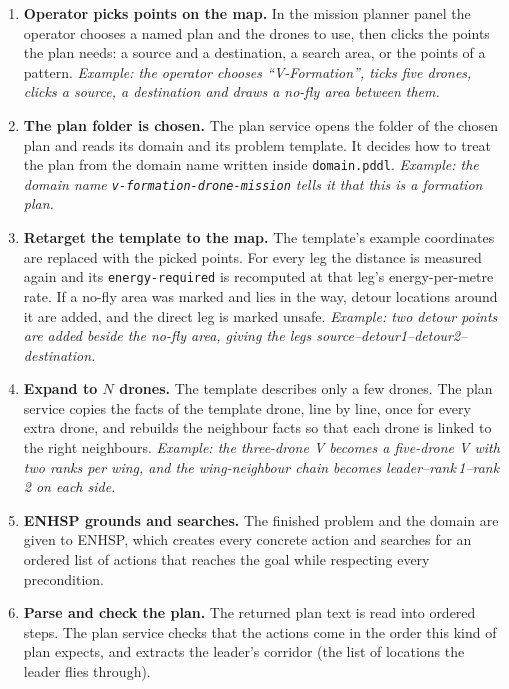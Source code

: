 \documentclass[11pt,a4paper,oneside]{report}
\newcommand{\code}[1]{\texttt{#1}}
\begin{document}
\begin{enumerate}[label=\textbf{Step \arabic*.},leftmargin=*,itemsep=4pt]
  \item \textbf{Operator picks points on the map.} In the mission planner panel the operator
        chooses a named plan and the drones to use, then clicks the points the plan needs: a
        source and a destination, a search area, or the points of a pattern. \emph{Example: the
        operator chooses ``V-Formation'', ticks five drones, clicks a source, a destination and
        draws a no-fly area between them.}
  \item \textbf{The plan folder is chosen.} The plan service opens the folder of the chosen plan
        and reads its domain and its problem template. It decides how to treat the plan from the
        domain name written inside \code{domain.pddl}. \emph{Example: the domain name
        \code{v-formation-drone-mission} tells it that this is a formation plan.}
  \item \textbf{Retarget the template to the map.} The template's example coordinates are
        replaced with the picked points. For every leg the distance is measured again and its
        \code{energy-required} is recomputed at that leg's energy-per-metre rate. If a no-fly
        area was marked and lies in the way, detour locations around it are added, and the
        direct leg is marked unsafe. \emph{Example: two detour points are added beside the no-fly
        area, giving the legs source--detour1--detour2--destination.}
  \item \textbf{Expand to $N$ drones.} The template describes only a few drones. The plan
        service copies the facts of the template drone, line by line, once for every extra
        drone, and rebuilds the neighbour facts so that each drone is linked to the right
        neighbours. \emph{Example: the three-drone V becomes a five-drone V with two ranks per
        wing, and the wing-neighbour chain becomes leader--rank\,1--rank\,2 on each side.}
  \item \textbf{ENHSP grounds and searches.} The finished problem and the domain are given to
        ENHSP, which creates every concrete action and searches for an ordered list of actions
        that reaches the goal while respecting every precondition.
  \item \textbf{Parse and check the plan.} The returned plan text is read into ordered steps. The
        plan service checks that the actions come in the order this kind of plan expects, and
        extracts the leader's corridor (the list of locations the leader flies through).

\end{enumerate}
\end{document}

